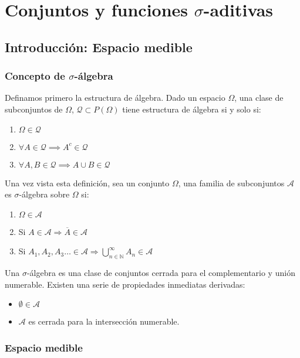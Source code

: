 
\section{Conjuntos y funciones $\sigma$-aditivas}

\subsection{Introducción: Espacio medible}

\subsubsection*{Concepto de $\sigma$-álgebra}
Definamos primero la estructura de álgebra. Dado un espacio $\Omega$, una clase de subconjuntos de $\Omega$, $\mathcal{Q} \subset P(\Omega)$ tiene estructura de álgebra si y solo si:
\begin{enumerate}
	\item $\Omega \in \mathcal{Q}$
	\item $\forall A \in \mathcal{Q} \implies A^c \in \mathcal{Q}$
	\item $\forall A,B \in \mathcal{Q} \implies A \cup B \in \mathcal{Q}$
\end{enumerate}


Una vez vista esta definición, sea un conjunto $\Omega$, una
familia de subconjuntos $\mathcal{A}$ es $\sigma$-álgebra sobre $\Omega$ si: 
\begin{enumerate}
\item $\Omega \in \mathcal{A}$
\item Si $A \in \mathcal{A} \Rightarrow \overline{A} \in \mathcal{A}$
\item Si $A_1, A_2, A_3\ldots \in \mathcal{A} \Rightarrow \displaystyle \bigcup_{n \in \mathbb{N}}^{\infty} A_n \in \mathcal{A}$
\end{enumerate}
Una $\sigma$-álgebra es una clase de conjuntos cerrada para el complementario y unión numerable. Existen una serie de propiedades inmediatas derivadas:
\begin{itemize}
  \item $\emptyset \in \mathcal{A}$
  \item $\mathcal{A}$ es cerrada para la  intersección numerable.
\end{itemize}

\subsubsection*{Espacio medible}

